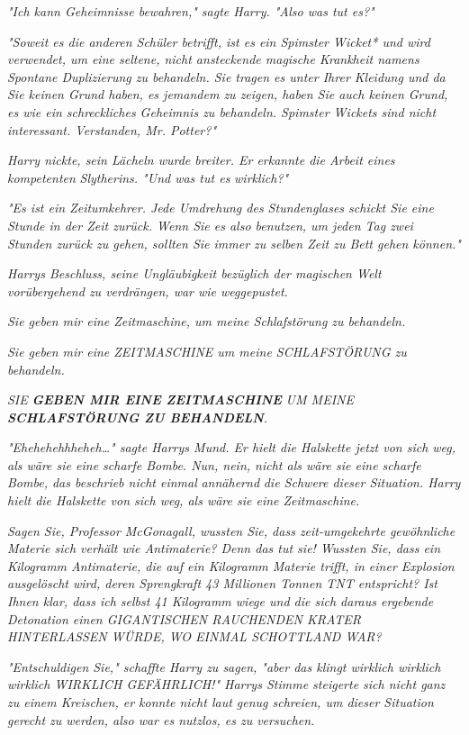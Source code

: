 {\emph{"Ich kann Geheimnisse bewahren," sagte Harry. "Also was tut es?"}

\emph{"Soweit es die anderen Schüler betrifft, ist es ein Spimster Wicket* und wird verwendet, um eine seltene, nicht ansteckende magische Krankheit namens Spontane Duplizierung zu behandeln. Sie tragen es unter Ihrer Kleidung und da Sie keinen Grund haben, es jemandem zu zeigen, haben Sie auch keinen Grund, es wie ein schreckliches Geheimnis zu behandeln. Spimster Wickets sind nicht interessant. Verstanden, Mr. Potter?"}

\emph{Harry nickte, sein Lächeln wurde breiter. Er erkannte die Arbeit eines} \emph{\emph{kompetenten}} \emph{Slytherins. "Und was tut es} \emph{\emph{wirklich?}"}

\emph{"Es ist ein Zeitumkehrer. Jede Umdrehung des Stundenglases schickt Sie eine Stunde in der Zeit zurück. Wenn Sie es also benutzen, um jeden Tag zwei Stunden zurück zu gehen, sollten Sie immer zu selben Zeit zu Bett gehen können."}

\emph{Harrys Beschluss, seine Ungläubigkeit bezüglich der magischen Welt vorübergehend zu verdrängen, war wie weggepustet.}

\emph{\emph{Sie geben mir eine Zeitmaschine, um meine Schlafstörung zu behandeln.}}

\emph{\emph{Sie geben mir eine ZEITMASCHINE um meine SCHLAFSTÖRUNG zu behandeln.}}

\emph{\emph{SIE}} \emph{\textbf{\emph{GEBEN MIR EINE ZEITMASCHINE}}} \emph{\emph{UM MEINE}} \emph{\textbf{\emph{SCHLAFSTÖRUNG ZU BEHANDELN}}\emph{.}}

\emph{"Ehehehehhheheh…" sagte Harrys Mund. Er hielt die Halskette jetzt von sich weg, als wäre sie eine scharfe Bombe. Nun, nein, nicht als wäre sie eine scharfe Bombe, das beschrieb nicht einmal} \emph{\emph{annähernd}} \emph{die Schwere dieser Situation. Harry hielt die Halskette von sich weg, als wäre sie eine Zeitmaschine.}

\emph{\emph{Sagen Sie, Professor McGonagall, wussten Sie, dass zeit-umgekehrte gewöhnliche Materie sich verhält wie Antimaterie? Denn das tut sie! Wussten Sie, dass ein Kilogramm Antimaterie, die auf ein Kilogramm Materie trifft, in einer Explosion ausgelöscht wird, deren Sprengkraft 43 Millionen Tonnen TNT entspricht? Ist Ihnen klar, dass ich selbst 41 Kilogramm wiege und die sich daraus ergebende Detonation einen GIGANTISCHEN RAUCHENDEN KRATER HINTERLASSEN WÜRDE, WO EINMAL SCHOTTLAND WAR?}}

\emph{"Entschuldigen Sie," schaffte Harry zu sagen, "aber das klingt wirklich wirklich} \emph{\emph{wirklich WIRKLICH GEFÄHRLICH!}" Harrys Stimme steigerte sich nicht ganz zu einem Kreischen, er konnte nicht laut genug schreien, um dieser Situation gerecht zu werden, also war es nutzlos, es zu versuchen.}

}
